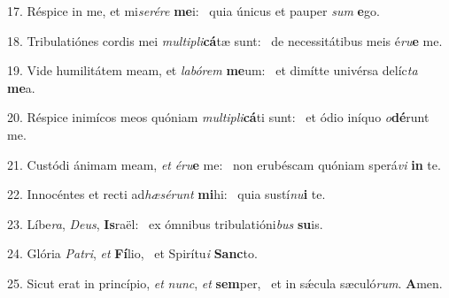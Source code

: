 17. Réspice in me, et mi\textit{se}\textit{ré}\textit{re} \textbf{me}i: \ast\  quia únicus et pauper \textit{sum} \textbf{e}go.\

18. Tribulatiónes cordis mei \textit{mul}\textit{ti}\textit{pli}\textbf{cá}tæ sunt: \ast\  de necessitátibus meis é\textit{ru}\textbf{e} me.\

19. Vide humilitátem meam, et \textit{la}\textit{bó}\textit{rem} \textbf{me}um: \ast\  et dimítte univérsa delíc\textit{ta} \textbf{me}a.\

20. Réspice inimícos meos quóniam \textit{mul}\textit{ti}\textit{pli}\textbf{cá}ti sunt: \ast\  et ódio iníquo \textit{o}\textbf{dé}runt me.\

21. Custódi ánimam meam, \textit{et} \textit{é}\textit{ru}\textbf{e} me: \ast\  non erubéscam quóniam sperá\textit{vi} \textbf{in} te.\

22. Innocéntes et recti ad\textit{hæ}\textit{sé}\textit{runt} \textbf{mi}hi: \ast\  quia sustí\textit{nu}\textbf{i} te.\

23. Líbe\textit{ra}, \textit{De}\textit{us}, \textbf{Is}raël: \ast\  ex ómnibus tribulatióni\textit{bus} \textbf{su}is.\

24. Glória \textit{Pa}\textit{tri}, \textit{et} \textbf{Fí}lio, \ast\  et Spirítu\textit{i} \textbf{Sanc}to.\

25. Sicut erat in princípio, \textit{et} \textit{nunc}, \textit{et} \textbf{sem}per, \ast\  et in sǽcula sæculó\textit{rum}. \textbf{A}men.\

